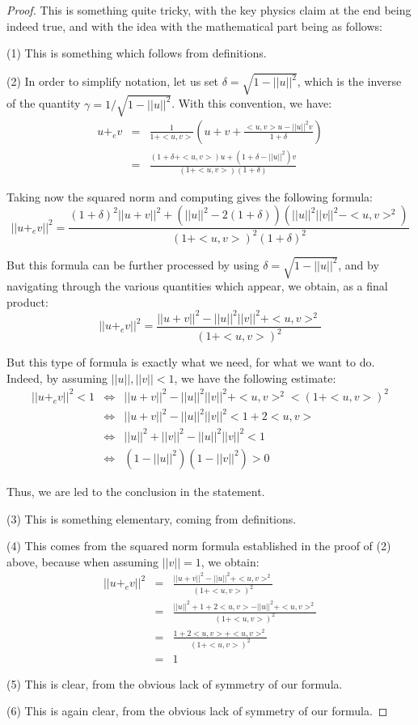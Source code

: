 \documentclass[12pt]{amsbook}
\begin{document}
\begin{proof}
This is something quite tricky, with the key physics claim at the end being indeed true, and with the idea with the mathematical part being as follows:

\medskip

(1) This is something which follows from definitions.

\medskip

(2) In order to simplify notation, let us set $\delta=\sqrt{1-||u||^2}$, which is the inverse of the quantity $\gamma=1/\sqrt{1-||u||^2}$. With this convention, we have:
\begin{eqnarray*}
u+_ev
&=&\frac{1}{1+<u,v>}\left(u+v+\frac{<u,v>u-||u||^2v}{1+\delta}\right)\\
&=&\frac{(1+\delta+<u,v>)u+(1+\delta-||u||^2)v}{(1+<u,v>)(1+\delta)}
\end{eqnarray*}

Taking now the squared norm and computing gives the following formula:
$$||u+_ev||^2
=\frac{(1+\delta)^2||u+v||^2+(||u||^2-2(1+\delta))(||u||^2||v||^2-<u,v>^2)}{(1+<u,v>)^2(1+\delta)^2}$$

But this formula can be further processed by using $\delta=\sqrt{1-||u||^2}$, and by navigating through the various quantities which appear, we obtain, as a final product:
$$||u+_ev||^2=\frac{||u+v||^2-||u||^2||v||^2+<u,v>^2}{(1+<u,v>)^2}$$

But this type of formula is exactly what we need, for what we want to do. Indeed, by assuming $||u||,||v||<1$, we have the following estimate:
\begin{eqnarray*}
||u+_ev||^2<1
&\iff&||u+v||^2-||u||^2||v||^2+<u,v>^2<(1+<u,v>)^2\\
&\iff&||u+v||^2-||u||^2||v||^2<1+2<u,v>\\
&\iff&||u||^2+||v||^2-||u||^2||v||^2<1\\
&\iff&(1-||u||^2)(1-||v||^2)>0
\end{eqnarray*}

Thus, we are led to the conclusion in the statement.

\medskip

(3) This is something elementary, coming from definitions.

\medskip

(4) This comes from the squared norm formula established in the proof of (2) above, because when assuming $||v||=1$, we obtain:
\begin{eqnarray*}
||u+_ev||^2
&=&\frac{||u+v||^2-||u||^2+<u,v>^2}{(1+<u,v>)^2}\\
&=&\frac{||u||^2+1+2<u,v>-||u||^2+<u,v>^2}{(1+<u,v>)^2}\\
&=&\frac{1+2<u,v>+<u,v>^2}{(1+<u,v>)^2}\\
&=&1
\end{eqnarray*}

(5) This is clear, from the obvious lack of symmetry of our formula.

\medskip

(6) This is again clear, from the obvious lack of symmetry of our formula.
\end{proof}
\end{document}

